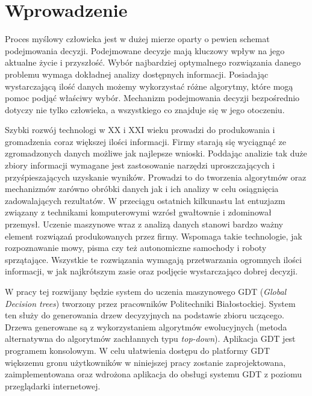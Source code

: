\chapter*{Wprowadzenie}
Proces myślowy człowieka jest w dużej mierze oparty o pewien schemat podejmowania decyzji. Podejmowane decyzje mają kluczowy wpływ na jego aktualne życie i przyszłość. Wybór najbardziej optymalnego rozwiązania danego problemu wymaga dokładnej analizy dostępnych informacji. Posiadając wystarczającą ilość danych możemy wykorzystać różne algorytmy, które mogą pomoc podjąć właściwy wybór. Mechanizm podejmowania decyzji bezpośrednio dotyczy nie tylko człowieka, a wszystkiego co znajduje się w jego otoczeniu. 

Szybki rozwój technologi w XX i XXI wieku prowadzi do produkowania i gromadzenia coraz większej ilości informacji. Firmy starają się wyciągnąć ze zgromadzonych danych możliwe jak najlepsze wnioski. Poddając analizie tak duże zbiory informacji wymagane jest zastosowanie narzędzi uproszczających i przyśpieszających uzyskanie wyników. Prowadzi to do tworzenia algorytmów oraz mechanizmów zarówno obróbki danych jak i ich analizy w celu osiągnięcia zadowalających rezultatów. W przeciągu ostatnich kilkunastu lat entuzjazm związany z technikami komputerowymi wzrósł gwałtownie i zdominował przemysł. Uczenie maszynowe wraz z analizą danych stanowi bardzo ważny element rozwiązań produkowanych przez firmy. Wspomaga takie technologie, jak rozpoznawanie mowy, pisma czy też autonomiczne samochody i roboty sprzątające. Wszystkie te rozwiązania wymagają przetwarzania ogromnych ilości informacji, w jak najkrótszym zasie oraz podjęcie wystarczająco dobrej decyzji.

W pracy tej rozwijany będzie system do uczenia maszynowego GDT (\textit{Global Decision trees})\cite{sgdt_1} tworzony przez pracowników Politechniki Białostockiej. System ten służy do generowania drzew decyzyjnych na podstawie zbioru uczącego. Drzewa generowane są z wykorzystaniem algorytmów ewolucyjnych (metoda alternatywna do algorytmów zachłannych typu \textit{top-down}). Aplikacja GDT jest programem konsolowym. W celu ułatwienia dostępu do platformy GDT większemu gronu użytkowników w niniejszej pracy zostanie zaprojektowana, zaimplementowana oraz wdrożona aplikacja do obsługi systemu GDT z poziomu przeglądarki internetowej.  


